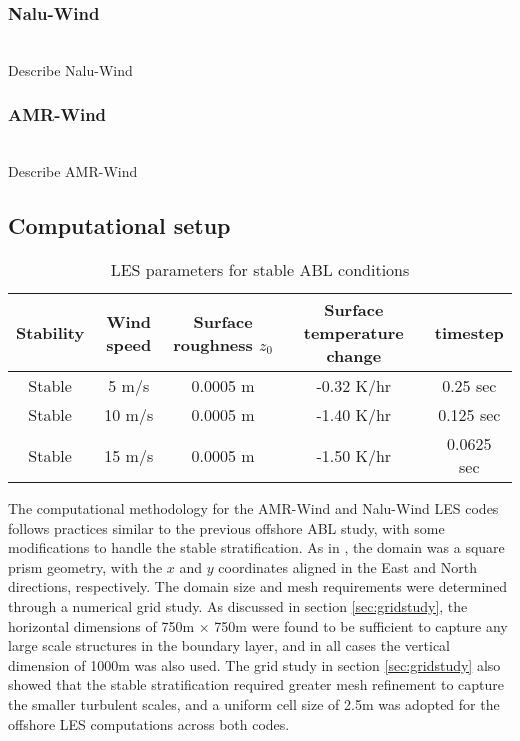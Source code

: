 \subsubsection{Nalu-Wind}
\\
Describe Nalu-Wind

\subsubsection{AMR-Wind}
\\
Describe AMR-Wind

\subsection{Computational setup}


\begin{table}
\caption{\label{tab:z0tempparam} LES parameters for stable ABL conditions}
\centering
\begin{tabular}{ccccc}
  \hline
  Stability & Wind speed & Surface roughness $z_0$ & Surface
  temperature change & timestep\\
  \hline
  Stable       & 5  m/s           & 0.0005 m       & -0.32 K/hr   & 0.25 sec   \\
  Stable       & 10 m/s           & 0.0005 m       & -1.40 K/hr   & 0.125 sec  \\
  Stable       & 15 m/s           & 0.0005 m       & -1.50 K/hr   & 0.0625 sec \\
\hline
\end{tabular}
\end{table}

The computational methodology for the AMR-Wind and Nalu-Wind LES codes
follows practices similar to the previous offshore ABL study, with
some modifications to handle the stable stratification.  As in
\cite{cheung2020large}, the domain was a square prism geometry, with
the $x$ and $y$ coordinates aligned in the East and North directions,
respectively.  The domain size and mesh requirements were determined
through a numerical grid study.  As discussed in section
\ref{sec:gridstudy}, the horizontal dimensions of 750m $\times$ 750m
were found to be sufficient to capture any large scale structures in
the boundary layer, and in all cases the vertical dimension of 1000m
was also used.  The grid study in section \ref{sec:gridstudy} also
showed that the stable stratification required greater mesh refinement
to capture the smaller turbulent scales, and a uniform cell size of
2.5m was adopted for the offshore LES computations across both codes.

